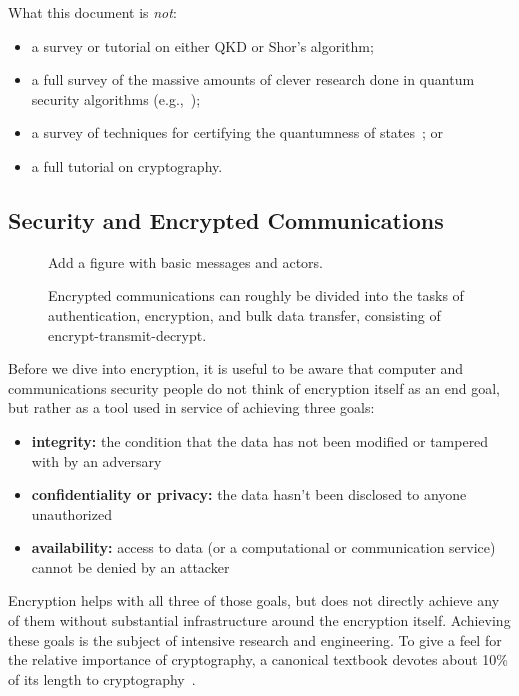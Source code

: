 What this document is \emph{not}:

\begin{itemize}
\item a survey or tutorial on either QKD or Shor's algorithm;
\item a full survey of the massive amounts of clever research done in
  quantum security algorithms
  (e.g.,~\cite{PhysRevA.100.052326,buhrman14:_posit_based_quant_crypt,ben-or2005fast,Crepeau:2002:SMQ:509907.510000});
\item a survey of techniques for certifying the quantumness of states~\cite{eisert2019cert}; or
\item a full tutorial on cryptography.
\end{itemize}

\subsection{Security and Encrypted Communications}

\begin{figure}
  {\color{Magenta} Add a figure with basic messages and actors.}
  \caption{Encrypted communications can roughly be divided into the
    tasks of authentication, encryption, and bulk data transfer,
    consisting of encrypt-transmit-decrypt.}
  \label{fig:encrypted-comm}
\end{figure}

Before we dive into encryption, it is useful to be aware that computer
and communications security people do not think of encryption itself
as an end goal, but rather as a tool used in service of achieving three
goals:

\begin{itemize}
\item {\bf integrity:} the condition that the data has not been
  modified or tampered with by an adversary
\item {\bf confidentiality or privacy:} the data hasn't been disclosed to anyone unauthorized
\item {\bf availability:} access to data (or a computational or
  communication service) cannot be denied by an attacker
\end{itemize}

Encryption helps with all three of those goals, but does not directly
achieve any of them without substantial infrastructure around the
encryption itself.  Achieving these goals is the subject of intensive
research and engineering.  To give a feel for the relative importance
of cryptography, a canonical textbook devotes about 10\% of its length
to cryptography~\cite{bishop2002art}.

